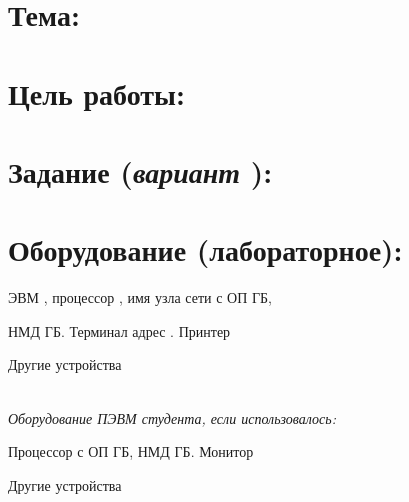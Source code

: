 \section{Тема:\uline{\hfill}}
\uline{\hfill} 

\section{Цель работы:\uline{\hfill}} 
\uline{\hfill} 

\uline{\hfill}

\uline{\hfill}

\section{Задание (\textnormal{\itshape вариант \textnumero \quad } ):\uline{\hfill}}
\uline{\hfill}

\uline{\hfill}

\uline{\hfill}

\uline{\hfill}

\uline{\hfill}

\section{Оборудование (лабораторное):}

ЭВМ \uline{\hspace{3cm}}, процессор \uline{\hspace{3cm}}, имя узла сети \uline{\hspace{3cm}} с ОП \uline{\hspace{2cm}} ГБ, 

НМД \uline{\hspace{2cm}} ГБ. Терминал \uline{\hspace{2cm}} адрес \uline{\hspace{3cm}} . Принтер \uline{\hfill}

Другие устройства \uline{\hfill}

\uline{\hfill}\\

\textit{Оборудование ПЭВМ студента, если использовалось:}

Процессор с \uline{\hspace{3cm}} ОП \uline{\hspace{2cm}} ГБ, НМД \uline{\hspace{2cm}} ГБ. Монитор \uline{\hfill}

Другие устройства \uline{\hfill}

\uline{\hfill}

